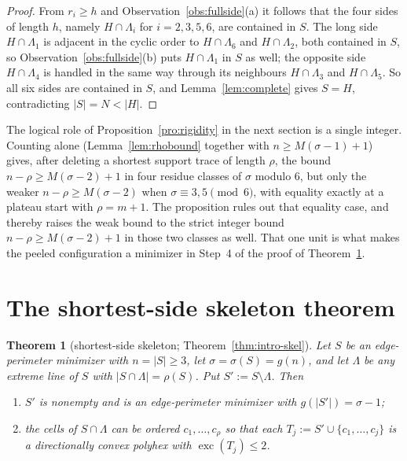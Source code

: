 \documentclass[11pt]{article}
\theoremstyle{plain}
\newtheorem{theorem}{Theorem}[section]
\theoremstyle{definition}
\theoremstyle{remark}
\newcommand{\sm}{\setminus}
\DeclareMathOperator{\exc}{exc}
\begin{document}
\begin{proof}
From \(r_{i}\ge h\) and Observation~\ref{obs:fullside}(a) it follows that the four sides
of length \(h\), namely \(H\cap\Lambda_{i}\) for \(i=2,3,5,6\), are contained in \(S\).
The long side \(H\cap\Lambda_{1}\) is adjacent in the cyclic order to \(H\cap\Lambda_{6}\)
and \(H\cap\Lambda_{2}\), both contained in \(S\), so Observation~\ref{obs:fullside}(b)
puts \(H\cap\Lambda_{1}\) in \(S\) as well; the opposite side \(H\cap\Lambda_{4}\) is
handled in the same way through its neighbours \(H\cap\Lambda_{3}\) and
\(H\cap\Lambda_{5}\). So all six sides are contained in \(S\), and
Lemma~\ref{lem:complete} gives \(S=H\), contradicting \(|S|=N<|H|\).
\end{proof}

The logical role of Proposition~\ref{pro:rigidity} in the next section is a single
integer. Counting alone (Lemma~\ref{lem:rhobound} together with \(n\ge M(\sigma-1)+1\))
gives, after deleting a shortest support trace of length \(\rho\), the bound
\(n-\rho\ge M(\sigma-2)+1\) in four residue classes of \(\sigma\) modulo \(6\), but only
the weaker \(n-\rho\ge M(\sigma-2)\) when \(\sigma\equiv3,5\pmod6\), with equality
exactly at a plateau start with \(\rho=m+1\). The proposition rules out that equality
case, and thereby raises the weak bound to the strict integer bound
\(n-\rho\ge M(\sigma-2)+1\) in those two classes as well. That one unit is what makes
the peeled configuration a minimizer in Step~4 of the proof of Theorem~\ref{thm:skel}.


\section{The shortest-side skeleton theorem}\label{sec:skeleton}

\begin{theorem}[shortest-side skeleton; Theorem~\ref{thm:intro-skel}]\label{thm:skel}
Let \(S\) be an edge-perimeter minimizer with \(n=|S|\ge3\), let \(\sigma=\sigma(S)=g(n)\),
and let \(\Lambda\) be \emph{any} extreme line of \(S\) with \(|S\cap\Lambda|=\rho(S)\). Put
\(S':=S\sm\Lambda\). Then
\begin{enumerate}
\item[(i)] \(S'\) is nonempty and is an edge-perimeter minimizer with \(g(|S'|)=\sigma-1\);
\item[(ii)] the cells of \(S\cap\Lambda\) can be ordered \(c_{1},\dots,c_{\rho}\) so that each
\(T_{j}:=S'\cup\{c_{1},\dots,c_{j}\}\) is a directionally convex polyhex with
\(\exc(T_{j})\le2\).
\end{enumerate}
\end{theorem}
\end{document}
